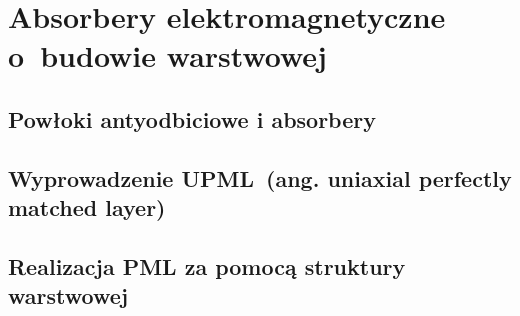 \chapter{Absorbery elektromagnetyczne o~budowie warstwowej}
\label{roz:pml}

\section{Powłoki antyodbiciowe i absorbery}

\section{Wyprowadzenie UPML~(ang. uniaxial perfectly matched layer)}

\section{Realizacja PML za pomocą struktury warstwowej}

